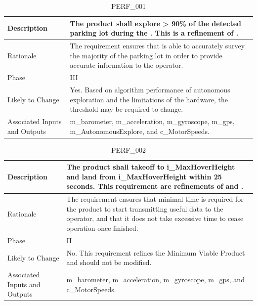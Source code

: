 \documentclass{article}
\begin{document}
\begin{table}[!h]
\begin{center}
\caption {PERF\_001} 
\label{PERF_001}
\begin{tabular}{ | m{3cm} | m{11cm} | }
\hline
Description & The product shall explore > 90\% of the detected parking lot during the \nameref{Autonomous Explore State}. This is a refinement of \nameref{STA_003}. \\
\hline
Rationale & The requirement ensures that \nameref{Autonomous Explore State} is able to accurately survey the majority of the parking lot in order to provide accurate information to the operator. \\
\hline
Phase & III \\
\hline
Likely to Change & Yes. Based on algorithm performance of autonomous exploration and the limitations of the hardware, the threshold may be required to change. \\
\hline
Associated Inputs and Outputs & m\_barometer, m\_acceleration, m\_gyroscope, m\_gps, m\_AutonomousExplore, and c\_MotorSpeeds.  \\
\hline
\end{tabular}
\end{center}
\end{table}

\begin{table}[!h]
\begin{center}
\caption {PERF\_002} 
\label{PERF_002}
\begin{tabular}{ | m{3cm} | m{11cm} | }
\hline
Description & The product shall takeoff to i\_MaxHoverHeight and land from i\_MaxHoverHeight within 25 seconds. This requirement are refinements of \nameref{STA_001} and \nameref{STA_006}.  \\
\hline
Rationale &  The requirement ensures that minimal time is required for the product to start transmitting useful data to the operator, and that it does not take excessive time to cease operation once finished. \\
\hline
Phase & II \\
\hline
Likely to Change & No. This requirement refines the Minimum Viable Product and should not be modified. \\
\hline
Associated Inputs and Outputs & m\_barometer, m\_acceleration, m\_gyroscope, m\_gps, and c\_MotorSpeeds.  \\
\hline
\end{tabular}
\end{center}
\end{table}
\end{document}
